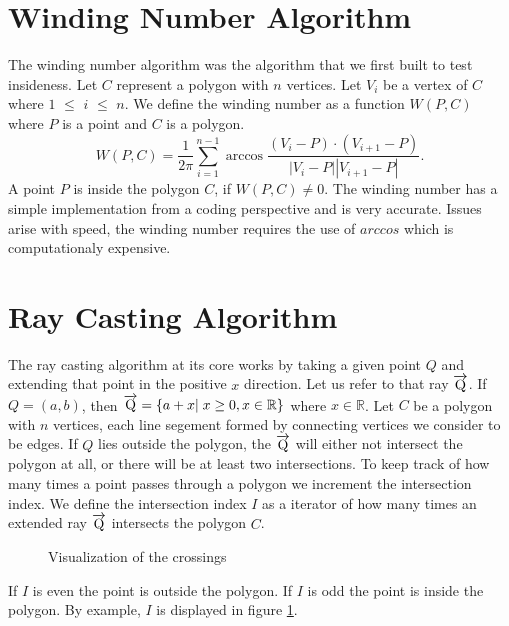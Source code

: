 \documentclass{article}
\begin{document}
\section{Winding Number Algorithm}
The winding number algorithm was the algorithm that we first built to test insideness.
Let $C$ represent a polygon with $n$ vertices.
Let $V_i$ be a vertex of $C$ where $1$ $\leq$ $i$ $\leq$ $n$.
We define the winding number as a function $W(P,C)$ where $P$ is a point and $C$ is a polygon.
$$
W(P,C) = \frac{1}{2\pi}\sum_{i=1}^{n-1}\arccos{\frac{(V_i-P)\cdot (V_{i+1}-P)}{|V_i-P||V_{i+1}-P|}}.
$$
A point $P$ is inside the polygon $C$, if $W(P,C) \not= 0$.
The winding number has a simple implementation from a coding perspective and is very accurate.
Issues arise with speed, the winding number requires the use of $arccos$ which is computationaly expensive.

\section{Ray Casting Algorithm}

The ray casting algorithm at its core works by taking a given point $Q$ and extending that point in the positive $x$ direction.
Let us refer  to that ray $\overrightarrow{\rm Q}$.
If $Q = (a,b)$, then $\overrightarrow{\rm Q} = \{ a + x | \; x \geq 0, x \in \mathbb{R} \}$ where $x \in \mathbb{R}$.
Let $C$ be a polygon with $n$ vertices, each line segement formed by connecting vertices we consider to be edges.
If $Q$ lies outside the polygon, the $\overrightarrow{\rm Q}$ will either not intersect the polygon at all, or there will be at least two intersections.
To keep track of how many times a point passes through a polygon we increment the intersection index.
We define the intersection index $I$ as a iterator of how many times an extended ray $\overrightarrow{\rm Q}$ intersects the polygon $C$.
\FloatBarrier
\begin{figure}[!h]
	  \vspace{0in}
	  \caption{\label{fig:raycasting} Visualization of the crossings}
\end{figure}
\FloatBarrier
If $I$ is even the point is outside the polygon.
If $I$ is odd the point is inside the polygon.
By example, $I$ is displayed in figure \ref{fig:raycasting}.
\end{document}
